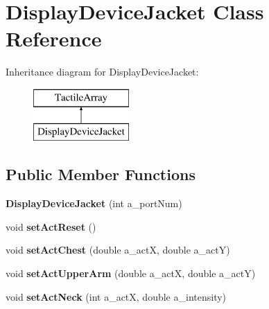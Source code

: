 \hypertarget{classDisplayDeviceJacket}{
\section{DisplayDeviceJacket Class Reference}
\label{classDisplayDeviceJacket}
}
Inheritance diagram for DisplayDeviceJacket:\begin{figure}[H]
\begin{center}
\leavevmode
\includegraphics[height=2cm]{classDisplayDeviceJacket}
\end{center}
\end{figure}
\subsection*{Public Member Functions}
\begin{DoxyCompactItemize}
\item 
\hypertarget{classDisplayDeviceJacket_a73dce07052df2ef3703406e3fdf3ef52}{
{\bfseries DisplayDeviceJacket} (int a\_\-portNum)}
\label{classDisplayDeviceJacket_a73dce07052df2ef3703406e3fdf3ef52}

\item 
\hypertarget{classDisplayDeviceJacket_a5b02adb89dc81459d7c869293a9f000a}{
void {\bfseries setActReset} ()}
\label{classDisplayDeviceJacket_a5b02adb89dc81459d7c869293a9f000a}

\item 
\hypertarget{classDisplayDeviceJacket_a1cc7bc19638a4d5e7a00677781952c29}{
void {\bfseries setActChest} (double a\_\-actX, double a\_\-actY)}
\label{classDisplayDeviceJacket_a1cc7bc19638a4d5e7a00677781952c29}

\item 
\hypertarget{classDisplayDeviceJacket_ab8db22ff8bd0069140df975adfe05719}{
void {\bfseries setActUpperArm} (double a\_\-actX, double a\_\-actY)}
\label{classDisplayDeviceJacket_ab8db22ff8bd0069140df975adfe05719}

\item 
\hypertarget{classDisplayDeviceJacket_a86bb0b50805faf6db0493618c3f10973}{
void {\bfseries setActNeck} (int a\_\-actX, double a\_\-intensity)}
\label{classDisplayDeviceJacket_a86bb0b50805faf6db0493618c3f10973}

\end{DoxyCompactItemize}
